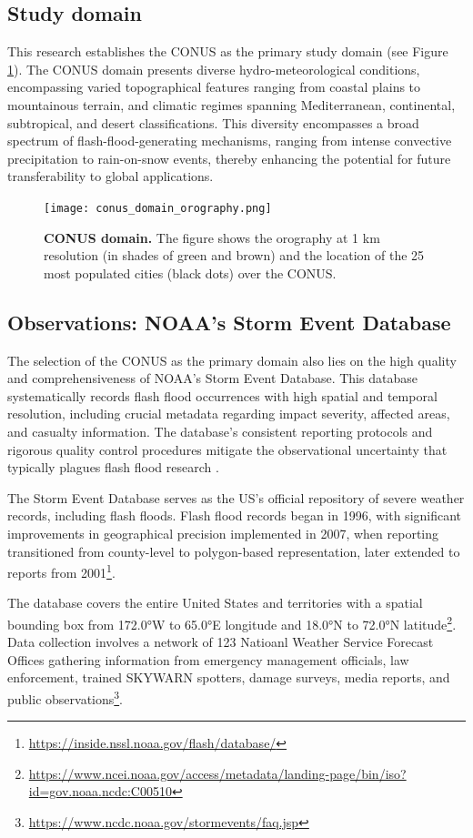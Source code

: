 \subsection{Study domain}

This research establishes the CONUS as the primary study domain (see Figure \ref{fig:conus_domain}). The CONUS domain presents diverse hydro-meteorological conditions, encompassing varied topographical features ranging from coastal plains to mountainous terrain, and climatic regimes spanning Mediterranean, continental, subtropical, and desert classifications. This diversity encompasses a broad spectrum of flash-flood-generating mechanisms, ranging from intense convective precipitation to rain-on-snow events, thereby enhancing the potential for future transferability to global applications.

\begin{figure}[htbp]
\centering
\texttt{[image: conus\_domain\_orography.png]}
\caption{\textbf{CONUS domain.} The figure shows the orography at 1 km resolution (in shades of green and brown) and the location of the 25 most populated cities (black dots) over the CONUS.}
\label{fig:conus_domain}
\end{figure}

\subsection{Observations: NOAA's Storm Event Database}

The selection of the CONUS as the primary domain also lies on the high quality and comprehensiveness of NOAA's Storm Event Database. This database systematically records flash flood occurrences with high spatial and temporal resolution, including crucial metadata regarding impact severity, affected areas, and casualty information. The database's consistent reporting protocols and rigorous quality control procedures mitigate the observational uncertainty that typically plagues flash flood research \citep{Panwar_2020}.

The Storm Event Database serves as the US's official repository of severe weather records, including flash floods. Flash flood records began in 1996, with significant improvements in geographical precision implemented in 2007, when reporting transitioned from county-level to polygon-based representation, later extended to reports from 2001\footnote{\url{https://inside.nssl.noaa.gov/flash/database/}}.

The database covers the entire United States and territories with a spatial bounding box from 172.0°W to 65.0°E longitude and 18.0°N to 72.0°N latitude\footnote{\url{https://www.ncei.noaa.gov/access/metadata/landing-page/bin/iso?id=gov.noaa.ncdc:C00510}}. Data collection involves a network of 123 Natioanl Weather Service Forecast Offices gathering information from emergency management officials, law enforcement, trained SKYWARN spotters, damage surveys, media reports, and public observations\footnote{\url{https://www.ncdc.noaa.gov/stormevents/faq.jsp}}.

